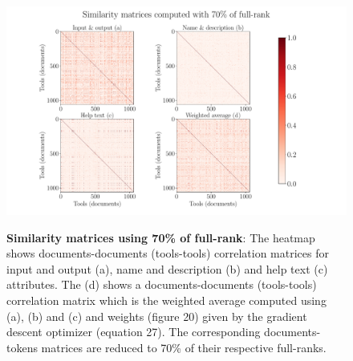\begin{figure}[h]
\begin{centering}
    {\includegraphics[scale=0.4]{figures/Similarity_matrices_070.pdf}}
    \caption[Similarity matrices computed using document-tokens matrices reduced to 70\% of their full-rank]{\textbf{Similarity matrices using 70\% of full-rank}: The heatmap shows documents-documents (tools-tools) correlation matrices for input and output (a), name and description (b) and help text (c) attributes. The (d) shows a documents-documents (tools-tools) correlation matrix which is the weighted average computed using (a), (b) and (c) and weights (figure 20) given by the gradient descent optimizer (equation 27). The corresponding documents-tokens matrices are reduced to 70\% of their respective full-ranks.}
\end{centering}
\end{figure}

